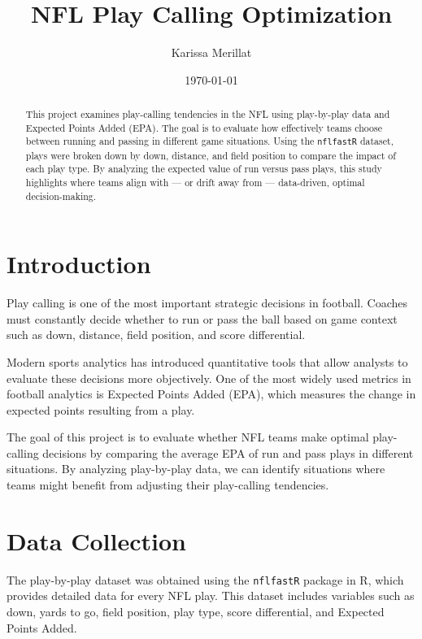 \documentclass[12pt]{article}
\title{NFL Play Calling Optimization}
\author{Karissa Merillat}
\date{\today}
\begin{document}
\maketitle

\begin{abstract}

This project examines play-calling tendencies in the NFL using play-by-play data and Expected Points Added (EPA). The goal is to evaluate how effectively teams choose between running and passing in different game situations. Using the \texttt{nflfastR} dataset, plays were broken down by down, distance, and field position to compare the impact of each play type. By analyzing the expected value of run versus pass plays, this study highlights where teams align with — or drift away from — data-driven, optimal decision-making.

\end{abstract}

\section{Introduction}

Play calling is one of the most important strategic decisions in football. Coaches must constantly decide whether to run or pass the ball based on game context such as down, distance, field position, and score differential.

Modern sports analytics has introduced quantitative tools that allow analysts to evaluate these decisions more objectively. One of the most widely used metrics in football analytics is Expected Points Added (EPA), which measures the change in expected points resulting from a play.

The goal of this project is to evaluate whether NFL teams make optimal play-calling decisions by comparing the average EPA of run and pass plays in different situations. By analyzing play-by-play data, we can identify situations where teams might benefit from adjusting their play-calling tendencies.

\section{Data Collection}

The play-by-play dataset was obtained using the \texttt{nflfastR} package in R, which provides detailed data for every NFL play. This dataset includes variables such as down, yards to go, field position, play type, score differential, and Expected Points Added.
\end{document}

